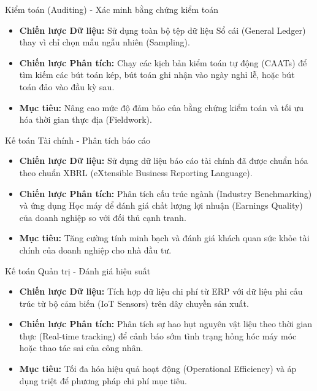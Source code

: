\documentclass[aspectratio=169,12pt]{beamer}
\begin{document}
\begin{frame}{Kiểm toán (Auditing) - Xác minh bằng chứng kiểm toán}
\begin{itemize}
    \item \textbf{Chiến lược Dữ liệu:} Sử dụng toàn bộ tệp dữ liệu Sổ cái (General Ledger) thay vì chỉ chọn mẫu ngẫu nhiên (Sampling).
    \item \textbf{Chiến lược Phân tích:} Chạy các kịch bản kiểm toán tự động (CAATs) để tìm kiếm các bút toán kép, bút toán ghi nhận vào ngày nghỉ lễ, hoặc bút toán đảo vào đầu kỳ sau.
    \item \textbf{Mục tiêu:} Nâng cao mức độ đảm bảo của bằng chứng kiểm toán và tối ưu hóa thời gian thực địa (Fieldwork).
\end{itemize}
\end{frame}

\begin{frame}{Kế toán Tài chính - Phân tích báo cáo}
\begin{itemize}
    \item \textbf{Chiến lược Dữ liệu:} Sử dụng dữ liệu báo cáo tài chính đã được chuẩn hóa theo chuẩn XBRL (eXtensible Business Reporting Language).
    \item \textbf{Chiến lược Phân tích:} Phân tích cấu trúc ngành (Industry Benchmarking) và ứng dụng Học máy để đánh giá chất lượng lợi nhuận (Earnings Quality) của doanh nghiệp so với đối thủ cạnh tranh.
    \item \textbf{Mục tiêu:} Tăng cường tính minh bạch và đánh giá khách quan sức khỏe tài chính của doanh nghiệp cho nhà đầu tư.
\end{itemize}
\end{frame}

\begin{frame}{Kế toán Quản trị - Đánh giá hiệu suất}
\begin{itemize}
    \item \textbf{Chiến lược Dữ liệu:} Tích hợp dữ liệu chi phí từ ERP với dữ liệu phi cấu trúc từ bộ cảm biến (IoT Sensors) trên dây chuyền sản xuất.
    \item \textbf{Chiến lược Phân tích:} Phân tích sự hao hụt nguyên vật liệu theo thời gian thực (Real-time tracking) để cảnh báo sớm tình trạng hỏng hóc máy móc hoặc thao tác sai của công nhân.
    \item \textbf{Mục tiêu:} Tối đa hóa hiệu quả hoạt động (Operational Efficiency) và áp dụng triệt để phương pháp chi phí mục tiêu.
\end{itemize}
\end{frame}
\end{document}
